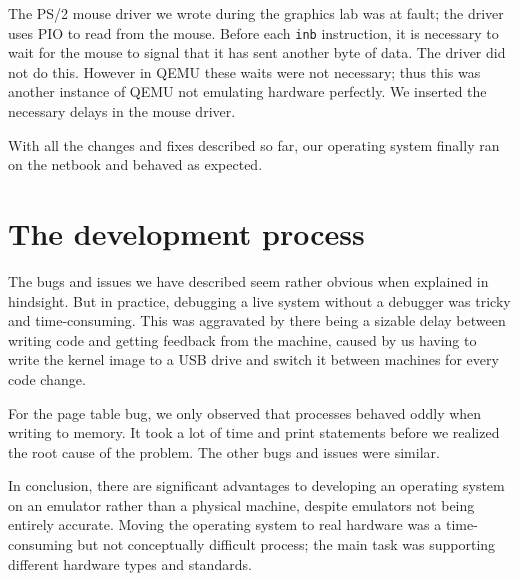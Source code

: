 \documentclass{report}
\begin{document}
The PS/2 mouse driver we wrote during the graphics lab was at fault; the
driver uses PIO to read from the mouse. Before each \texttt{inb}
instruction, it is necessary to wait for the mouse to signal that it has sent
another byte of data. The driver did not do this. However in QEMU these waits
were not necessary; thus this was another instance of QEMU not emulating
hardware perfectly. We inserted the necessary delays in the mouse driver.


With all the changes and fixes described so far, our operating system finally
ran on the netbook and behaved as expected. 

\section{The development process}
The bugs and issues we have described seem rather obvious when explained in
hindsight. But in practice, debugging a live system without a debugger was
tricky and time-consuming. This was aggravated by there being a sizable delay
between writing code and getting feedback from the machine, caused by us
having to write the kernel image to a USB drive and switch it between
machines for every code change.

For the page table bug, we only observed that processes behaved oddly when
writing to memory. It took a lot of time and print statements before we
realized the root cause of the problem. The other bugs and issues were
similar.

In conclusion, there are significant advantages to developing an operating
system on an emulator rather than a physical machine, despite emulators not
being entirely accurate. Moving the operating system to real hardware was a
time-consuming but not conceptually difficult process; the main task was
supporting different hardware types and standards.




\end{document}
